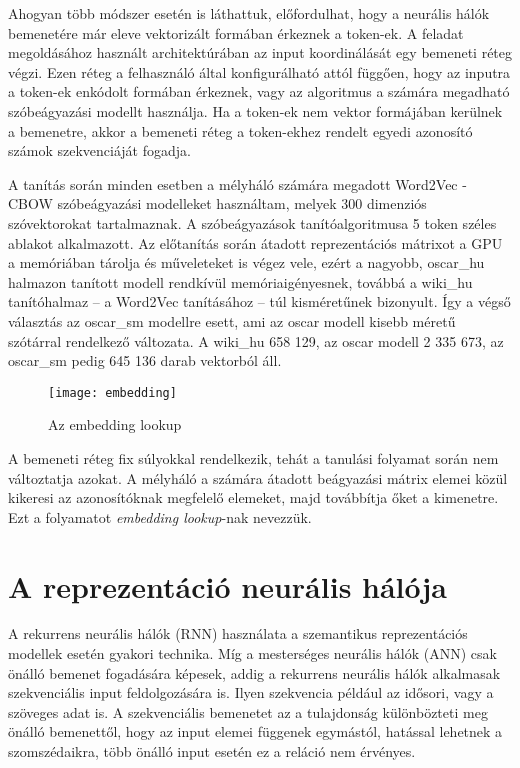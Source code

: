 Ahogyan több módszer esetén is láthattuk, előfordulhat, hogy a neurális hálók bemenetére már eleve vektorizált formában érkeznek a token-ek. A feladat megoldásához használt architektúrában az input koordinálását egy bemeneti réteg végzi. Ezen réteg a felhasználó által konfigurálható attól függően, hogy az inputra a token-ek enkódolt formában érkeznek, vagy az algoritmus a számára megadható szóbeágyazási modellt használja. Ha a token-ek nem vektor formájában kerülnek a bemenetre, akkor a bemeneti réteg a token-ekhez rendelt egyedi azonosító számok szekvenciáját fogadja.

A tanítás során minden esetben a mélyháló számára megadott Word2Vec - CBOW szóbeágyazási modelleket használtam, melyek 300 dimenziós szóvektorokat tartalmaznak. A szóbeágyazások tanítóalgoritmusa 5 token széles ablakot alkalmazott. Az előtanítás során átadott reprezentációs mátrixot a GPU a memóriában tárolja és műveleteket is végez vele, ezért a nagyobb, oscar\_hu halmazon tanított modell rendkívül memóriaigényesnek, továbbá a wiki\_hu tanítóhalmaz – a Word2Vec tanításához – túl kisméretűnek bizonyult. Így a végső választás az oscar\_sm modellre esett, ami az oscar modell kisebb méretű szótárral rendelkező változata. A wiki\_hu 658 129, az oscar modell 2 335 673, az oscar\_sm pedig 645 136 darab vektorból áll.

\begin{figure}[H]
	\centering
	\texttt{[image: embedding]}
	\caption{Az embedding lookup}
\end{figure}

A bemeneti réteg fix súlyokkal rendelkezik, tehát a tanulási folyamat során nem változtatja azokat. A mélyháló a számára átadott beágyazási mátrix elemei közül kikeresi az azonosítóknak megfelelő elemeket, majd továbbítja őket a kimenetre. Ezt a folyamatot \textit{embedding lookup}-nak nevezzük.

\section{A reprezentáció neurális hálója}

A rekurrens neurális hálók (RNN) használata a szemantikus reprezentációs modellek esetén gyakori technika. Míg a mesterséges neurális hálók (ANN) csak önálló bemenet fogadására képesek, addig a rekurrens neurális hálók alkalmasak szekvenciális input feldolgozására is. Ilyen szekvencia például az idősori, vagy a szöveges adat is. A szekvenciális bemenetet az a tulajdonság különbözteti meg önálló bemenettől, hogy az input elemei függenek egymástól, hatással lehetnek a szomszédaikra, több önálló input esetén ez a reláció nem érvényes.

